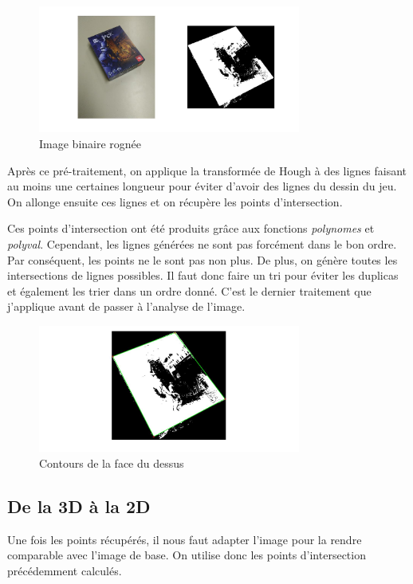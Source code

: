 \documentclass{st50_template}
\begin{document}
\begin{figure}[ht]
    \centering
    \includegraphics[width=0.77\textwidth]{images/rognage.jpg}
    \caption{Image binaire rognée}
    \label{rognage}
\end{figure}

Après ce pré-traitement, on applique la transformée de Hough à des lignes faisant au moins une certaines longueur pour éviter d'avoir des lignes du dessin du jeu. On allonge ensuite ces lignes et on récupère les points d'intersection. 

Ces points d'intersection ont été produits grâce aux fonctions \emph{polynomes} et \emph{polyval}. Cependant, les lignes générées ne sont pas forcément dans le bon ordre. Par conséquent, les points ne le sont pas non plus. De plus, on génère toutes les intersections de lignes possibles. Il faut donc faire un tri pour éviter les duplicas et également les trier dans un ordre donné. C'est le dernier traitement que j'applique avant de passer à l'analyse de l'image.

\begin{figure}[ht]
    \centering
    \includegraphics[width=0.77\textwidth]{images/contourEtPts.jpg}
    \caption{Contours de la face du dessus}
    \label{contourEtPts}
\end{figure}

\subsection{De la 3D à la 2D}
Une fois les points récupérés, il nous faut adapter l'image pour la rendre comparable avec l'image de base. On utilise donc les points d'intersection précédemment calculés.
\end{document}

